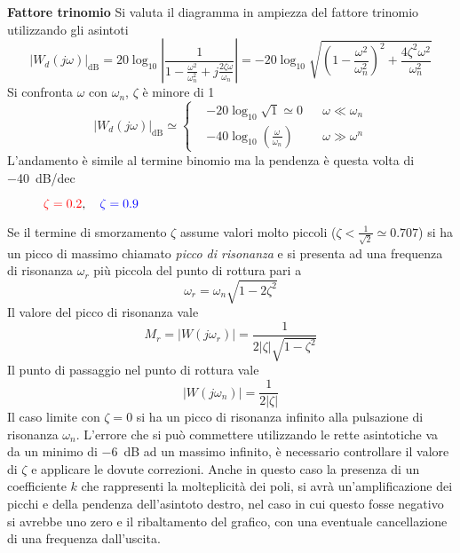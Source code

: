 \newpage
\textbf{Fattore trinomio}
Si valuta il diagramma in ampiezza del fattore trinomio utilizzando gli asintoti
$$
|W_d(j\omega)|_{\si{\deci\bel}} = 20\log_{10} \left|\frac{1}
{1-\frac{\omega^2}{\omega_n^2}+j\frac{2\zeta\omega}{\omega_n}}\right|=
-20\log_{10}\sqrt{
\left(1-\frac{\omega^2}{\omega_n^2}\right)^2+\frac{4\zeta^2\omega^2}
{\omega_n^2} }
$$
Si confronta $\omega$ con $\omega_n$, $\zeta$ è minore di 1
$$
|W_d(j\omega)|_{\si{\deci\bel}} \simeq\left\{
\begin{aligned}
&-20\log_{10}\sqrt{1}\simeq 0 & &\omega\ll\omega_n \\
&-40\log_{10}\left(\frac{\omega}{\omega_n}\right) & & \omega\gg\omega^n
\end{aligned}\right.
$$
L'andamento è simile al termine binomio ma la pendenza è questa volta di
\SI{-40}{\deci\bel/dec}
\begin{figure}[h]
\centering
\def\Wn{10}
\def\zOne{0.2}
\def\K{1}
\def\zTwo{0.9}
\caption{$\textcolor{red}{\zeta=\zOne},\quad \textcolor{blue}{\zeta=\zTwo} $}
\end{figure}

Se il termine di smorzamento $\zeta$ assume valori molto piccoli
($\zeta<\frac{1}{\sqrt{2}}\simeq0.707$) si ha un picco di massimo chiamato
\textit{picco di risonanza} e si presenta ad una frequenza di risonanza
$\omega_r$ più piccola del punto di rottura pari a
$$
\omega_r = \omega_n\sqrt{1-2\zeta^2}
$$
Il valore del picco di risonanza vale
$$
M_r = |W(j\omega_r)| = \frac{1}{2|\zeta|\sqrt{1-\zeta^2}}
$$
Il punto di passaggio nel punto di rottura vale
$$
|W(j\omega_n)| = \frac{1}{2|\zeta|}
$$
Il caso limite con $\zeta=0$ si ha un picco di risonanza infinito alla
pulsazione di risonanza $\omega_n$.
L'errore che si può commettere utilizzando le rette asintotiche va da un minimo
di \SI{-6}{\deci\bel} ad un massimo infinito, è necessario controllare il
valore di $\zeta$ e applicare le dovute correzioni.
Anche in questo caso la presenza di un coefficiente $k$ che rappresenti la
molteplicità dei poli, si avrà un'amplificazione dei picchi e della pendenza
dell'asintoto destro, nel caso in cui questo fosse negativo si avrebbe uno zero
e il ribaltamento del grafico, con una eventuale cancellazione di una frequenza
dall'uscita.

